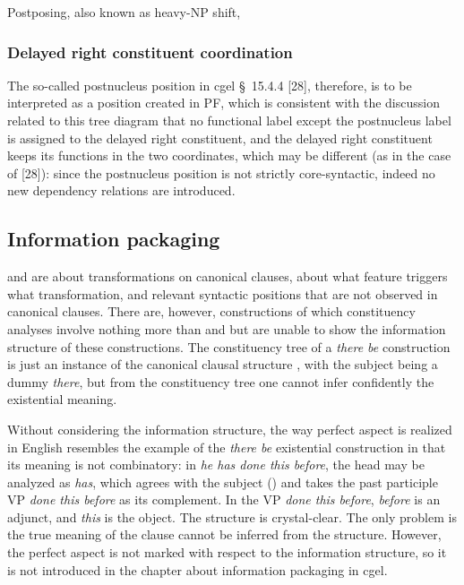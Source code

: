 \documentclass{article}
\newcommand*{\citesec}[1]{\S~{#1}}
\newcommand*{\corpus}[1]{\emph{#1}}
\begin{document}
Postposing, also known as heavy-NP shift, 

\subsubsection{Delayed right constituent coordination}

The so-called postnucleus position in \ac{cgel} \citesec{15.4.4} [28],
therefore, is to be interpreted as a position created in PF,
which is consistent with the discussion related to this tree diagram 
that no functional label except the postnucleus label is assigned to the delayed right constituent,
and the delayed right constituent keeps its functions in the two coordinates, 
which may be different (as in the case of [28]):
since the postnucleus position is not strictly core-syntactic,
indeed no new dependency relations are introduced.

\subsection{Information packaging}

 and  are about 
transformations on canonical clauses, 
about what feature triggers what transformation,
and relevant syntactic positions that are not observed in canonical clauses.
There are, however, constructions of which constituency analyses involve 
nothing more than  and 
but are unable to show the information structure of these constructions.
The constituency tree of a \corpus{there be} construction is just 
an instance of the canonical clausal structure ,
with the subject being a dummy \corpus{there},
but from the constituency tree one cannot infer confidently the existential meaning.

Without considering the information structure, 
the way perfect aspect is realized in English
resembles the example of the \corpus{there be} existential construction
in that its meaning is not combinatory:
in \corpus{he has done this before},
the head may be analyzed as \corpus{has},
which agrees with the subject ()
and takes the past participle VP \corpus{done this before} as its complement.
In the VP \corpus{done this before}, \corpus{before} is an adjunct, 
and \corpus{this} is the object. 
The structure is crystal-clear.
The only problem is the true meaning of the clause cannot be inferred from the structure.
However, the perfect aspect is not marked with respect to the information structure,
so it is not introduced in the chapter about information packaging in \ac{cgel}.
\end{document}
